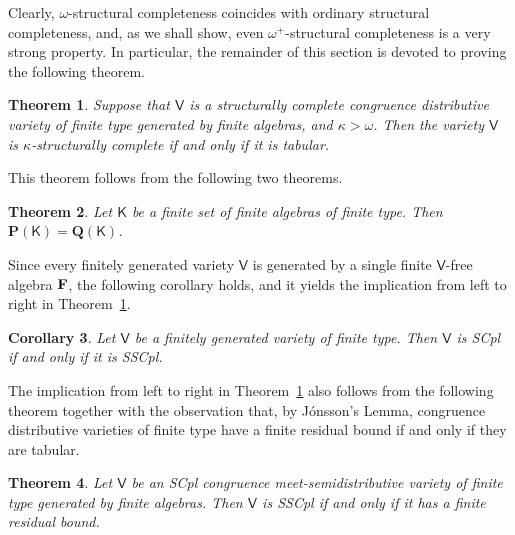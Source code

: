 \documentclass[submission,copyright,creativecommons]{eptcs}
\newtheorem{theorem}{Theorem}[section]
\newtheorem{cor}[theorem]{Corollary}
\theoremstyle{definition}
\newcommand{\alg}[1]{{{\textbf{\upshape #1}}}}
\newcommand{\VV}{\mathbf{V}}
\newcommand{\QQ}{\mathbf{Q}}
\newcommand{\PR}{\mathbf{P}}
\newcommand{\vv}[1]{\mathsf {#1}}
\newcommand{\vV}{\vv V}
\newcommand{\vK}{\vv K}
\newcommand{\FrV}{\alg F_\vv V(\omega)}
\newcommand{\Def}[1]{\textit{#1}}
\newcommand{\VO}{\vv V^o}
\newcommand{\QP}{\vv Q^p}
\newcommand{\QO}{\vv Q^o}
\begin{document}

Clearly, $\omega$-structural completeness coincides with ordinary structural completeness, and, as we shall show, even $\omega^+$-structural completeness is a very strong property. In particular, the remainder of this section is devoted to proving the following theorem.

\begin{theorem} \label{th-fatab}
	Suppose that $\vV$ is a structurally complete congruence distributive variety of finite type generated by finite algebras, and $\kappa > \omega$. Then the variety $\vV$ is $\kappa$-structurally complete if and only if it is tabular.
\end{theorem}

This theorem follows from the following two theorems.

\begin{theorem}\label{th-tabular1}
	Let $\vv K$ be a finite set of finite algebras of finite type. Then $\PR(\vK) = \QQ(\vK)$.
\end{theorem}

Since every finitely generated variety $\vV$ is generated by a single finite $\vV$-free algebra $\alg{F}$, the following corollary holds, and it yields the implication from left to right in Theorem~\ref{th-fatab}.

\begin{cor}\label{cor-tab}
	Let $\vV$ be a finitely generated variety of finite type. Then $\vV$ is SCpl if and only if it is SSCpl.
\end{cor}

The implication from left to right in Theorem~\ref{th-fatab} also follows from the following theorem together with the observation that, by Jónsson’s Lemma, congruence distributive varieties of finite type have a finite residual bound if and only if they are tabular.

\begin{theorem}\label{th-fmp}
	Let $\vv V$ be an SCpl congruence meet-semidistributive variety of finite type generated by finite algebras. Then $\vv V$ is SSCpl if and only if it has a finite residual bound.
\end{theorem}
\end{document}
